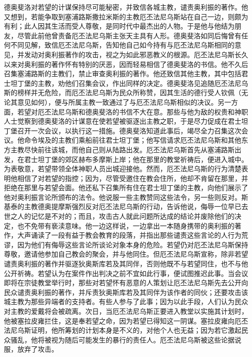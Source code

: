 德奥斐洛对若望的计谋保持尽可能秘密，并致信各城主教，谴责奥利振的著作。他又想到，若能争取到塞浦路斯撒拉米斯的主教厄丕法尼乌斯站在自己一边，则颇为有利；此人因其生活而受人尊敬，是同时代中最杰出的人物。于是他与他结为朋友，尽管此前他曾责备厄丕法尼乌斯主张天主具有人形。德奥斐洛如同后悔曾有任何不同见解，致信厄丕法尼乌斯，告知他自己如今持有与厄丕法尼乌斯相同的意见，并发动对奥利振著作的攻击，视之为如此邪恶教义的根源。厄丕法尼乌斯长久以来对奥利振的著作怀有特别的厌恶，因而轻易相信了德奥斐洛的书信。他不久后召集塞浦路斯的主教们，禁止审查奥利振的著作。他还致信其他主教，其中包括君士坦丁堡的主教，劝他们召集会议，作出同样的决定。德奥斐洛见追随厄丕法尼乌斯的榜样并无危险，而厄丕法尼乌斯为民众所称赞，因其生活的德行受人钦佩（无论其意见如何），便与所属主教一致通过了与厄丕法尼乌斯相似的决议。另一方面，若望对厄丕法尼乌斯和德奥斐洛的书信不大在意。那些与他为敌的权贵和神职人士觉察到德奥斐洛的计谋意在使若望被驱逐出主教之职，于是尽力促成在君士坦丁堡召开一次会议，以执行这一措施。德奥斐洛知道此事后，竭尽全力召集这次会议。他命令埃及的主教们乘船前往君士坦丁堡；他写信请求厄丕法尼乌斯和其他东方主教尽快前往该城，而他自己则从陆路出发。厄丕法尼乌斯首先从塞浦路斯出发，在君士坦丁堡的郊区赫布多摩斯上岸；他在那里的教堂祈祷后，便进入城中。为表敬意，若望带领全体神职人员出城迎接他。然而，厄丕法尼乌斯的行为清楚表明他相信了对若望的指控；因为，尽管受邀住在教会住所，他却不肯留在那里，并拒绝在那里与若望会面。他还私下召集所有住在君士坦丁堡的主教，向他们展示了他对奥利振言论所颁布的法令。他说服一些主教赞同这些法令，另一些则反对。斯基泰的主教德奥提摩斯强烈反对厄丕法尼乌斯的行动，告诉他说，侮辱一位早已去世之人的记忆是不对的；而且，攻击古人就此问题所达成的结论并废除他们的决定，也不免带有亵渎意味。他一边这样说，一边拿出一本随身携带的奥利振的著作，大声诵读了一段有益于教会教育的段落，并指出那些谴责这些言论的人行为荒谬，因为他们有侮辱这些言论所谈论对象本身的危险。若望仍对厄丕法尼乌斯保持尊敬，邀请他参加自己教会的聚会，并与他同住。但厄丕法尼乌斯宣称，除非若望谴责奥利振的著作并驱逐狄奥斯库若及其同伴，否则他既不与若望同住，也不与他公开祈祷。若望认为在案件作出判决之前不宜如此行事，便试图推迟此事。当会议即将在宗徒教堂举行时，那些对若望怀有恶意的人策划让厄丕法尼乌斯先去公开向民众谴责奥利振的著作，并斥责狄奥斯库若及其同伴为该作者的同伙；还要攻击该城主教为那些异端者的支持者。有些人参与了此事；因为以此手段，人们认为民众对主教的爱戴将会被疏离。次日，当厄丕法尼乌斯正要进入教堂以实施其计划时，他被塞拉皮雍拦住，这是奉若望之命，因为若望已得知这一阴谋。塞拉皮雍向厄丕法尼乌斯证明，他所筹划的计划本身是不义的，对他个人也无益；因为若它激起民众骚乱，他将被视为随后可能发生的暴行的责任人。厄丕法尼乌斯被这些论据说服，放弃了攻击。\par

